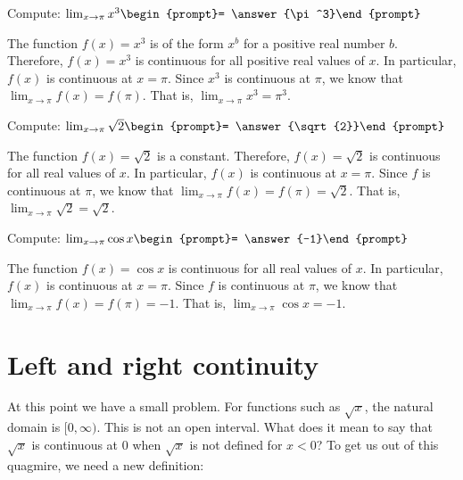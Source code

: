 \documentclass{ximera}
\begin{document}
\begin{question}
  Compute:
  $\lim_{x\to \pi} x^3\begin{prompt}= \answer{\pi^3}\end{prompt}$
  \begin{feedback}
    The function $f(x)=x^3$ is of the form $x^b$ for a positive real number
    $b$.  Therefore, $f(x)=x^3$ is continuous for all positive real values of
    $x$.  In particular, $f(x)$ is continuous at $x=\pi$.  Since $x^3$
    is continuous at $\pi$, we know that $\lim_{x\to \pi} f(x) = f(\pi)$.
    That is, $\lim_{x\to \pi} x^3 = \pi^3$.
  \end{feedback}  
\end{question}
\begin{question}
  Compute:
  $\lim_{x\to \pi} \sqrt{2}\begin{prompt}= \answer{\sqrt{2}}\end{prompt}$
  \begin{feedback}
    The function $f(x)= \sqrt{2}$ is a constant.
  Therefore, $f(x)=\sqrt{2}$ is continuous for all real values of
    $x$.  In particular, $f(x)$ is continuous at $x=\pi$.  Since $f$
    is continuous at $\pi$, we know that $\lim_{x\to \pi} f(x) = f(\pi)=\sqrt{2}$.
    That is, $\lim_{x\to \pi} \sqrt{2}= \sqrt{2}$.
  \end{feedback}  
\end{question}
\begin{question}
  Compute:
  $\lim_{x\to \pi} \cos{x}\begin{prompt}= \answer{-1}\end{prompt}$
  \begin{feedback}
    The function $f(x)=  \cos{x}$ is continuous
 for all real values of
    $x$.  In particular, $f(x)$ is continuous at $x=\pi$.  Since $f$
    is continuous at $\pi$, we know that $\lim_{x\to \pi} f(x) = f(\pi)=-1$.
    That is, $\lim_{x\to \pi} \cos{x}= -1$.
  \end{feedback}  
\end{question}

\section{Left and right continuity}


At this point we have a small problem.  For functions such as
$\sqrt{x}$, the natural domain is $[0, \infty)$.  This is not an
open interval.  What does it mean to say that $\sqrt{x}$ is continuous
at $0$ when $\sqrt{x}$ is not defined for $x<0$? To get us out of this
quagmire, we need a new definition:
\end{document}
